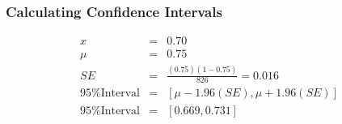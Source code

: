 \documentclass{beamer}
\begin{document}
\begin{frame}
  \frametitle{Calculating Confidence Intervals}
  \begin{displaymath}
    \begin{array}{rcl}
      x & = & 0.70 \\[2em]
      \mu & = & 0.75\\[2em]
      SE & = & \frac{(0.75)(1-0.75)}{826} = 0.016\\[2em]
      \text{95\% Interval} &  = & [\mu - 1.96(SE), \mu + 1.96(SE)] \\[2em]
      \text{95\% Interval} &  = & [0.669,0.731] \\[2em]
    \end{array}
  \end{displaymath} 
\end{frame}
\end{document}
